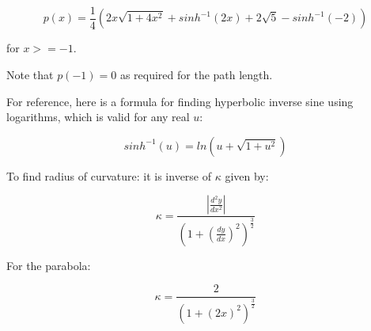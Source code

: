 \documentclass[final]{article}
\begin{document}
\begin{equation}
  p(x) = \frac{1}{4} \left(  2x \sqrt{ 1 + 4x^{2} } + sinh^{-1} (2x)  +2 \sqrt{5} - sinh^{-1}(-2) \right)
\end{equation}

for $x >= -1$.

Note that $p(-1) = 0$ as required for the path length.

For reference, here is a formula for finding hyperbolic inverse sine using logarithms, which is valid for any real $u$:

\begin{equation}
  sinh^{-1}(u) = ln(u + \sqrt{1 + u^{2} })
\end{equation}

To find radius of curvature: it is inverse of $\kappa$ given by:

\begin{equation}
  \kappa = \frac{|\frac{d^2 y}{dx^2}|} {(1 + (\frac{dy}{dx})^2)^{\frac{3}{2}}}
\end{equation}

For the parabola:

\begin{equation}
  \kappa = \frac{2} {(1 + (2x)^2)^{\frac{3}{2}}}
\end{equation}
\end{document}
